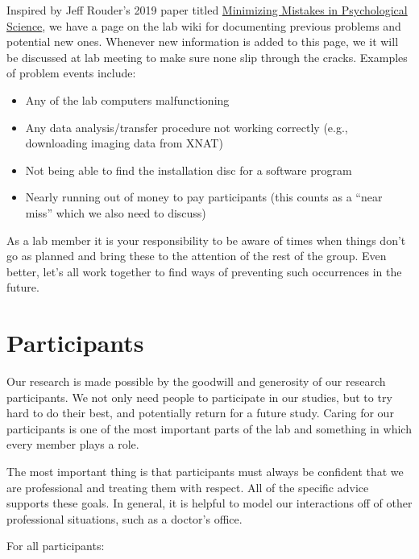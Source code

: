 \documentclass[letterpaper,11pt,oneside]{memoir}
\begin{document}
Inspired by Jeff Rouder's 2019 paper titled \href{https://doi.org/10.1177/2515245918801915}{Minimizing Mistakes in Psychological Science}, we have a page on the lab wiki for documenting previous problems and potential new ones. Whenever new information is added to this page, we it will be discussed at lab meeting to make sure none slip through the cracks. Examples of problem events include:

\begin{itemize}
\item Any of the lab computers malfunctioning
\item Any data analysis/transfer procedure not working correctly (e.g., downloading imaging data from XNAT)
\item Not being able to find the installation disc for a software program
\item Nearly running out of money to pay participants (this counts as a ``near miss'' which we also need to discuss)
\end{itemize}

As a lab member it is your responsibility to be aware of times when things don't go as planned and bring these to the attention of the rest of the group. Even better, let's all work together to find ways of preventing such occurrences in the future.




\section{Participants}
\label{sec:participants}

Our research is made possible by the goodwill and generosity of our research participants. We not only need people to participate in our studies, but to try hard to do their best, and potentially return for a future study. Caring for our participants is one of the most important parts of the lab and something in which every member plays a role.

The most important thing is that participants must always be confident that we are professional and treating them with respect. All of the specific advice supports these goals. In general, it is helpful to model our interactions off of other professional situations, such as a doctor's office.

For all participants:
\end{document}
